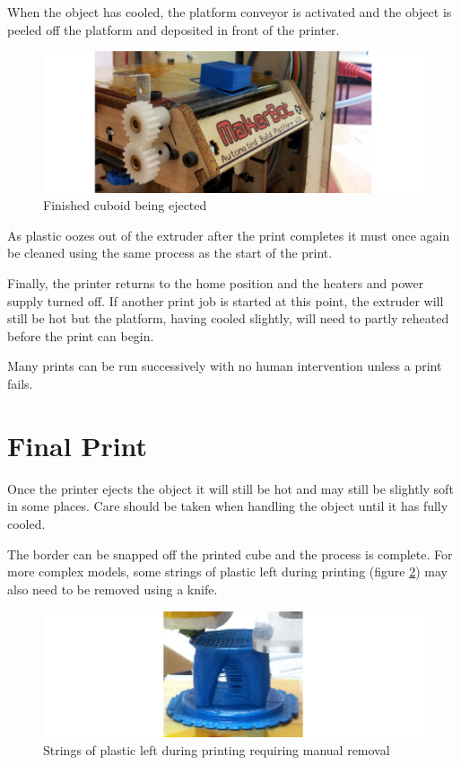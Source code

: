 			When the object has cooled, the platform conveyor is activated and the
			object is peeled off the platform and deposited in front of the printer.
			
			\begin{figure}
				\includegraphics[width=1\textwidth]{diagrams/eject.pdf}
				\caption{Finished cuboid being ejected}
				\label{fig:eject}
			\end{figure}
			
			As plastic oozes out of the extruder after the print completes it must
			once again be cleaned using the same process as the start of the print.
			
			Finally, the printer returns to the home position and the heaters and
			power supply turned off. If another print job is started at this point,
			the extruder will still be hot but the platform, having cooled slightly,
			will need to partly reheated before the print can begin.
			
			Many prints can be run successively with no human intervention unless a
			print fails.
			
		
	\section{Final Print}
		
		Once the printer ejects the object it will still be hot and may still be
		slightly soft in some places. Care should be taken when handling the object
		until it has fully cooled.
		
		The border can be snapped off the printed cube and the process is complete.
		For more complex models, some strings of plastic left during printing
		(figure \ref{fig:stringing}) may also need to be removed using a knife.
		
		\begin{figure}
			\includegraphics[width=1\textwidth]{diagrams/stringing.pdf}
			\caption{Strings of plastic left during printing requiring manual removal}
			\label{fig:stringing}
		\end{figure}
